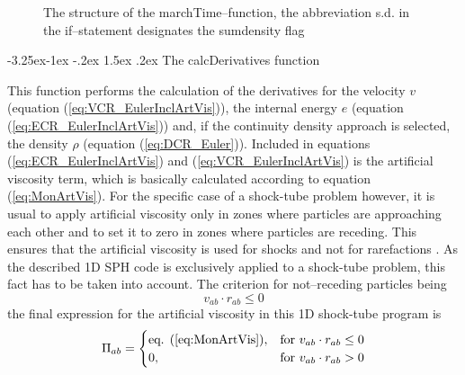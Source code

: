 \documentclass{report}
\makeatletter
\renewcommand\paragraph{\@startsection{paragraph}{4}{\z@}%
  {-3.25ex\@plus -1ex \@minus -.2ex}%
  {1.5ex \@plus .2ex}%
  {\normalfont\normalsize\bfseries}}
\makeatother
\begin{document}
\begin{figure}[H]
\caption{The structure of the marchTime--function, the abbreviation s.d. in the if--statement designates the sumdensity flag}
\end{figure}

\paragraph{The calcDerivatives function}

This function performs the calculation of the derivatives for the velocity $v$ (equation (\ref{eq:VCR_EulerInclArtVis})), the internal energy $e$ (equation (\ref{eq:ECR_EulerInclArtVis})) and, if the continuity density approach is selected, the density $\rho$ (equation (\ref{eq:DCR_Euler})). Included in equations (\ref{eq:ECR_EulerInclArtVis}) and (\ref{eq:VCR_EulerInclArtVis}) is the artificial viscosity term, which is basically calculated according to equation (\ref{eq:MonArtVis}). For the specific case of a shock-tube problem however, it is usual to apply artificial viscosity only in zones where particles are approaching each other and to set it to zero in zones where particles are receding. This ensures that the artificial viscosity is used for shocks and not for rarefactions \cite{Monaghan2005}. As the described 1D SPH code is exclusively applied to a shock-tube problem, this fact has to be taken into account. 
The criterion for not--receding particles being 
\begin{equation}
 v_{ab}\cdot r_{ab}\leq 0
\end{equation}
the final expression for the artificial viscosity in this 1D shock-tube program is
\begin{equation}
\Pi_{ab}=\begin{cases}
\text{eq. (\ref{eq:MonArtVis})}, &  \text{for~} v_{ab}\cdot r_{ab}\leq 0 \\
0,&  \text{for~} v_{ab}\cdot r_{ab}> 0 
\end{cases}
\end{equation}
\end{document}
